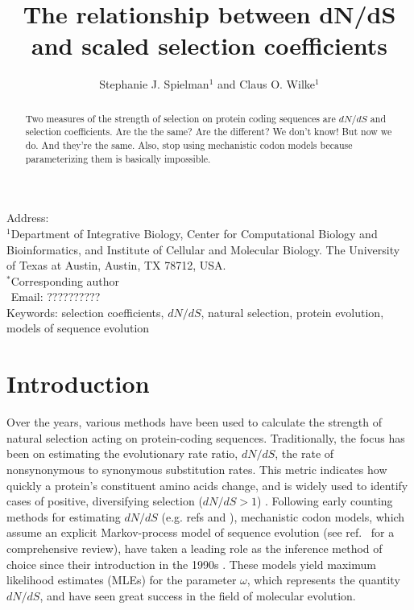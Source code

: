 \documentclass[11pt]{article}
\begin{document}
\title{\textbf{The relationship between dN/dS and scaled selection coefficients}}
\author{Stephanie J. Spielman$^{1}$ and Claus O. Wilke$^{1}$}
\date{}

\maketitle
\noindent
Address:\\
$^1$Department of Integrative Biology, Center for Computational Biology and Bioinformatics, and Institute of Cellular and Molecular Biology.
The University of Texas at Austin, Austin, TX 78712, USA.\\

\bigskip
\noindent
$^*$Corresponding author\\
$\phantom{^*}$Email: ??????????\\

\bigskip
\noindent Keywords: selection coefficients, $dN/dS$, natural selection, protein evolution, models of sequence evolution

\newpage
\begin{abstract}
Two measures of the strength of selection on protein coding sequences are $dN/dS$ and selection coefficients. Are the the same? Are the different? We don't know! But now we do. And they're the same. Also, stop using mechanistic codon models because parameterizing them is basically impossible.
  
\end{abstract}


\section*{Introduction}

Over the years, various methods have been used to calculate the strength of natural selection acting on protein-coding sequences. Traditionally, the focus has been on estimating the evolutionary rate ratio, $dN/dS$, the rate of nonsynonymous to synonymous substitution rates. This metric indicates how quickly a protein's constituent amino acids change, and is widely used to identify cases of positive, diversifying selection ($dN/dS > 1$) \cite{NielsenYang1998, Yangetal2000, KosakovskyPondFrost2005, Huelsenbecketal2006}. Following early counting methods for estimating $dN/dS$ (e.g. refs \cite{LWL85} and \cite{NG86}), mechanistic codon models, which assume an explicit Markov-process model of sequence evolution (see ref.~\cite{Anisimova2009} for a comprehensive review), have taken a leading role as the inference method of choice since their introduction in the 1990s \cite{GoldmanYang1994, MuseGaut1994, NielsenYang1998}. These models yield maximum likelihood estimates (MLEs) for the parameter $\omega$, which represents the quantity $dN/dS$, and have seen great success in the field of molecular evolution. 
\end{document}
